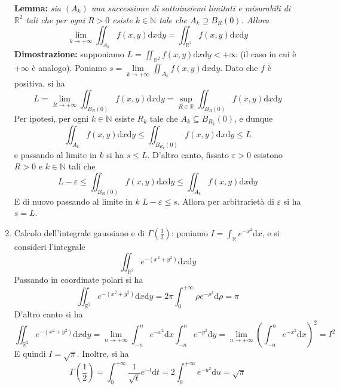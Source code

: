 \documentclass[a4paper,11pt]{article}
\begin{document}
\begin{enumerate}
	\textbf{Lemma:} \textit{sia $(A_k)$ una successione di sottoinsiemi limitati e misurabili di $\mathbb{R}^2$ tali che per ogni $R>0$ esiste $k\in\mathbb{N}$ tale che $A_k\supseteq B_R(0)$. Allora
	\[\lim\limits_{k\to+\infty}\iint_{A_k}f(x,y)\mathrm{d}x\mathrm{d}y=\iint_{\mathbb{R}^2}f(x,y)\mathrm{d}x\mathrm{d}y\]}
	\textbf{Dimostrazione:} supponiamo $L=\iint_{\mathbb{R}^2}f(x,y)\mathrm{d}x\mathrm{d}y<+\infty$ (il caso in cui è $+\infty$ è analogo). Poniamo $s=\lim\limits_{k\to+\infty}\iint_{A_k}f(x,y)\mathrm{d}x\mathrm{d}y$. Dato che $f$ è positiva, si ha
	\[L=\lim\limits_{R\to+\infty}\iint_{B_R(0)}f(x,y)\mathrm{d}x\mathrm{d}y=\sup_{R\in\mathbb{R}}\iint_{B_R(0)}f(x,y)\mathrm{d}x\mathrm{d}y\]
	Per ipotesi, per ogni $k\in\mathbb{N}$ esiste $R_k$ tale che $A_k\subseteq B_{R_k}(0)$, e dunque
	\[\iint_{A_k}f(x,y)\mathrm{d}x\mathrm{d}y\leq\iint_{B_{R_k}(0)}f(x,y)\mathrm{d}x\mathrm{d}y\leq L\]
	e passando al limite in $k$ si ha $s\leq L$.
	D'altro canto, fissato $\varepsilon>0$ esistono $R>0$ e $k\in\mathbb{N}$ tali che
	\[L-\varepsilon\leq\iint_{B_R(0)}f(x,y)\mathrm{d}x\mathrm{d}y\leq\iint_{A_k}f(x,y)\mathrm{d}x\mathrm{d}y\]
	E di nuovo passando al limite in $k$ $L-\varepsilon\leq s$. Allora per arbitrarietà di $\varepsilon$ si ha $s=L$.
	\item Calcolo dell'integrale gaussiano e di $\Gamma\left(\frac{1}{2}\right)$: poniamo $I=\int_{\mathbb{R}}e^{-x^2}\mathrm{d}x$, e si consideri l'integrale
	\[\iint_{\mathbb{R}^2}e^{-(x^2+y^2)}\mathrm{d}x\mathrm{d}y\]
	Passando in coordinate polari si ha
	\[\iint_{\mathbb{R}^2}e^{-(x^2+y^2)}\mathrm{d}x\mathrm{d}y=2\pi\int_{0}^{+\infty}\rho e^{-\rho^2}\mathrm{d}\rho=\pi\]
	D'altro canto si ha 
	\[\iint_{\mathbb{R}^2}e^{-(x^2+y^2)}\mathrm{d}x\mathrm{d}y=\lim\limits_{n\to+\infty}\int_{-n}^{n}e^{-x^2}\mathrm{d}x\int_{-n}^{n}e^{-y^2}\mathrm{d}y=\lim\limits_{n\to+\infty}\left(\int_{-n}^{n}e^{-x^2}\mathrm{d}x\right)^2=I^2\]
	E quindi $I=\sqrt{\pi}$.
	Inoltre, si ha
	\[\Gamma\left(\frac{1}{2}\right)=\int_{0}^{+\infty}\frac{1}{\sqrt{t}}e^{-t}\mathrm{d}t=2\int_{0}^{+\infty}e^{-u^2}\mathrm{d}u=\sqrt{\pi}\]
\end{enumerate}
\end{document}
